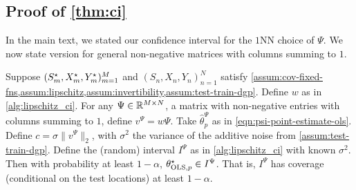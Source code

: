 \subsection{Proof of \cref{thm:ci}}\label{app:proof-ci-thm}
In the main text, we stated our confidence interval for the $1$NN choice of $\Psi$. We now state version for general non-negative matrices with columns summing to $1$.
\begin{theorem}
    \label{thm:ci-general-psi}
    Suppose $(S^{\star}_m, X^{\star}_m, Y^{\star}_m)_{m=1}^M$ and $(S_n, X_n, Y_n)_{n=1}^N$ satisfy \cref{assum:cov-fixed-fns,assum:lipschitz,assum:invertibility,assum:test-train-dgp}. 
    Define $w$ as in \cref{alg:lipschitz_ci}. For any $\Psi \in \mathbb{R}^{M \times N}$, a matrix with non-negative entries with columns summing to $1$, define $v^{\Psi} = w\Psi$. Take $\hat{\theta}_p^{\Psi}$ as in \cref{eqn:psi-point-estimate-ols}. 
    Define $c=\sigma\|v^{\Psi}\|_2$, with $\sigma^2$ the variance of the additive noise from \cref{assum:test-train-dgp}. Define the (random) interval $I^{\Psi}$ as in  \cref{alg:lipschitz_ci} with known $\sigma^2$.
    Then with probability at least $1-\alpha$, $\theta^{\star}_{\text{OLS},p} \in I^{\Psi}$. That is, $I^{\Psi}$ has coverage (conditional on the test locations) at least $1-\alpha$. 
\end{theorem}
